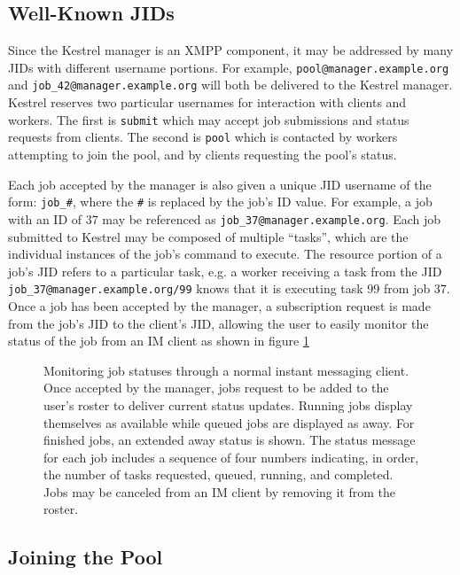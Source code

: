 \subsection{Well-Known JIDs}

\label{sec:Kestrel:JIDs} Since the Kestrel manager is an XMPP component,
it may be addressed by many JIDs with different username portions.
For example, \texttt{pool@manager.example.org} and \texttt{job\_42@manager.example.org}
will both be delivered to the Kestrel manager. Kestrel reserves two
particular usernames for interaction with clients and workers. The
first is \texttt{submit} which may accept job submissions and status
requests from clients. The second is \texttt{pool} which is contacted
by workers attempting to join the pool, and by clients requesting
the pool's status.

Each job accepted by the manager is also given a unique JID username
of the form: \texttt{job\_\#}, where the \texttt{\#} is replaced by
the job's ID value. For example, a job with an ID of 37 may be referenced
as \texttt{job\_37@manager.example.org}. Each job submitted to Kestrel
may be composed of multiple {}``tasks'', which are the individual
instances of the job's command to execute. The resource portion of
a job's JID refers to a particular task, e.g. a worker receiving a
task from the JID \texttt{job\_37@manager.example.org/99} knows that
it is executing task 99 from job 37. Once a job has been accepted
by the manager, a subscription request is made from the job's JID
to the client's JID, allowing the user to easily monitor the status
of the job from an IM client as shown in figure \ref{fig:IM-Client}

%
\begin{figure}

\caption{\label{fig:IM-Client} Monitoring job statuses through a normal instant
messaging client. Once accepted by the manager, jobs request to be
added to the user's roster to deliver current status updates. Running
jobs display themselves as available while queued jobs are displayed
as away. For finished jobs, an extended away status is shown. The
status message for each job includes a sequence of four numbers indicating,
in order, the number of tasks requested, queued, running, and completed.
Jobs may be canceled from an IM client by removing it from the roster.}

\end{figure}



\subsection{Joining the Pool}

